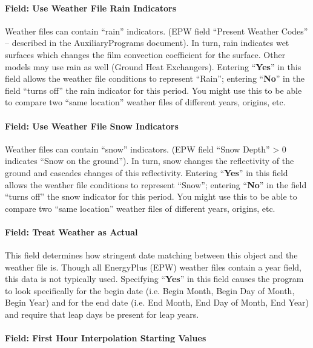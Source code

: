 \paragraph{Field: Use Weather File Rain Indicators}\label{field-use-weather-file-rain-indicators-1}

Weather files can contain ``rain'' indicators. (EPW field ``Present Weather Codes'' -- described in the
AuxiliaryPrograms document). In turn, rain indicates wet surfaces which changes the film convection
coefficient for the surface. Other models may use rain as well (Ground Heat Exchangers). Entering
``\textbf{Yes}'' in this field allows the weather file conditions to represent ``Rain''; entering
``\textbf{No}'' in the field ``turns off'' the rain indicator for this period. You might use this
to be able to compare two ``same location'' weather files of different years, origins, etc.

\paragraph{Field: Use Weather File Snow Indicators}\label{field-use-weather-file-snow-indicators-1}

Weather files can contain ``snow'' indicators. (EPW field ``Snow Depth'' \textgreater{} 0 indicates
``Snow on the ground''). In turn, snow changes the reflectivity of the ground and cascades changes of this
reflectivity. Entering ``\textbf{Yes}'' in this field allows the weather file conditions to represent
``Snow''; entering ``\textbf{No}'' in the field ``turns off'' the snow indicator for this period. You might
use this to be able to compare two ``same location'' weather files of different years, origins, etc.

\paragraph{Field: Treat Weather as Actual}\label{field-treat-weather-as-actual}

This field determines how stringent date matching between this object and the weather file is. Though all
EnergyPlus (EPW) weather files contain a year field, this data is not typically used. Specifying
``\textbf{Yes}'' in this field causes the program to look specifically for the begin date (i.e. Begin Month,
Begin Day of Month, Begin Year) and for the end date (i.e. End Month, End Day of Month, End Year) and require
that leap days be present for leap years.

\paragraph{Field: First Hour Interpolation Starting Values}\label{field-first-hour-interpolation-starting-values}

